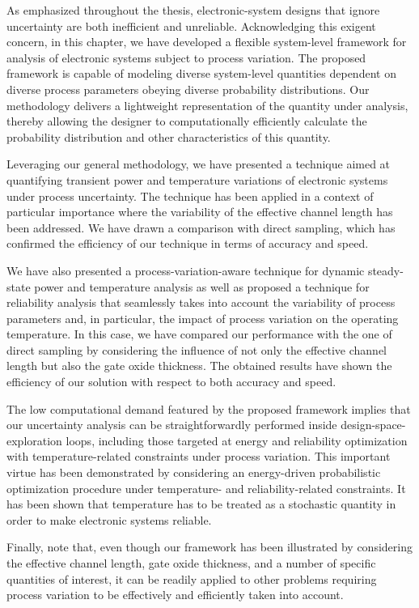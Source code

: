 As emphasized throughout the thesis, electronic-system designs that ignore
uncertainty are both inefficient and unreliable. Acknowledging this exigent
concern, in this chapter, we have developed a flexible system-level framework
for analysis of electronic systems subject to process variation. The proposed
framework is capable of modeling diverse system-level quantities dependent on
diverse process parameters obeying diverse probability distributions. Our
methodology delivers a lightweight representation of the quantity under
analysis, thereby allowing the designer to computationally efficiently calculate
the probability distribution and other characteristics of this quantity.

Leveraging our general methodology, we have presented a technique aimed at
quantifying transient power and temperature variations of electronic systems
under process uncertainty. The technique has been applied in a context of
particular importance where the variability of the effective channel length has
been addressed. We have drawn a comparison with direct sampling, which has
confirmed the efficiency of our technique in terms of accuracy and speed.

We have also presented a process-variation-aware technique for dynamic
steady-state power and temperature analysis as well as proposed a technique for
reliability analysis that seamlessly takes into account the variability of
process parameters and, in particular, the impact of process variation on the
operating temperature. In this case, we have compared our performance with the
one of direct sampling by considering the influence of not only the effective
channel length but also the gate oxide thickness. The obtained results have
shown the efficiency of our solution with respect to both accuracy and speed.

The low computational demand featured by the proposed framework implies that our
uncertainty analysis can be straightforwardly performed inside
design-space-exploration loops, including those targeted at energy and
reliability optimization with temperature-related constraints under process
variation. This important virtue has been demonstrated by considering an
energy-driven probabilistic optimization procedure under temperature- and
reliability-related constraints. It has been shown that temperature has to be
treated as a stochastic quantity in order to make electronic systems reliable.

Finally, note that, even though our framework has been illustrated by
considering the effective channel length, gate oxide thickness, and a number of
specific quantities of interest, it can be readily applied to other problems
requiring process variation to be effectively and efficiently taken into
account.
